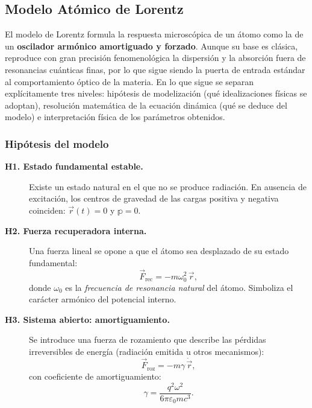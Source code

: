 \documentclass[12pt, a4paper]{article}
\theoremstyle{plain}
\theoremstyle{definition}
\theoremstyle{remark}
\newcommand{\ve}[1]{\vec{#1}}
\begin{document}
\subsection{Modelo Atómico de Lorentz}

El modelo de Lorentz formula la respuesta microscópica de un átomo como la de
un \textbf{oscilador armónico amortiguado y forzado}. Aunque su base es
clásica, reproduce con gran precisión fenomenológica la dispersión y la
absorción fuera de resonancias cuánticas finas, por lo que sigue siendo la
puerta de entrada estándar al comportamiento óptico de la materia.
En lo que sigue se separan explícitamente tres niveles: hipótesis de
modelización (qué idealizaciones físicas se adoptan), resolución matemática
de la ecuación dinámica (qué se deduce del modelo) e interpretación física
de los parámetros obtenidos.

\subsubsection{Hipótesis del modelo}

\begin{description}
  \item[\textbf{H1. Estado fundamental estable.}]
        Existe un estado natural en el que no se produce radiación. En
        ausencia de excitación, los centros de gravedad de las cargas
        positiva y negativa coinciden: $\ve{r}(t)=0$ y $\mathbb{p}=0$.

  \item[\textbf{H2. Fuerza recuperadora interna.}]
        Una fuerza lineal se opone a que el átomo sea desplazado de su
        estado fundamental:
        \[
          \ve{F}_\text{rec} = -m\omega_0^2\,\ve{r},
        \]
        donde $\omega_0$ es la \emph{frecuencia de resonancia natural} del
        átomo. Simboliza el carácter armónico del potencial interno.

  \item[\textbf{H3. Sistema abierto: amortiguamiento.}]
        Se introduce una fuerza de rozamiento que describe las pérdidas
        irreversibles de energía (radiación emitida u otros mecanismos):
        \[
          \ve{F}_\text{roz} = -m\gamma\,\dot{\ve{r}},
        \]
        con coeficiente de amortiguamiento:
        \begin{equation}
          \gamma = \frac{q^2\omega^2}{6\pi\varepsilon_0 m c^3}.
          \label{eq:gamma}
        \end{equation}
\end{description}
\end{document}
